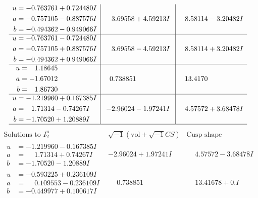 \documentclass[1p]{elsarticle_modified}
\theoremstyle{definition}
\newcommand{\I}{\sqrt{-1}}
\begin{document}
$$\begin{array}{c|c|c}
\begin{aligned}
u &= -0.763761 + 0.724480 I \\
a &= -0.757105 - 0.887576 I \\
b &= -0.494362 - 0.949066 I\end{aligned}
 & \phantom{-}3.69558 + 4.59213 I & \phantom{-}8.58114 - 3.20482 I \\ \hline\begin{aligned}
u &= -0.763761 - 0.724480 I \\
a &= -0.757105 + 0.887576 I \\
b &= -0.494362 + 0.949066 I\end{aligned}
 & \phantom{-}3.69558 - 4.59213 I & \phantom{-}8.58114 + 3.20482 I \\ \hline\begin{aligned}
u &= \phantom{-}1.18645\phantom{ +0.000000I} \\
a &= -1.67012\phantom{ +0.000000I} \\
b &= \phantom{-}1.86730\phantom{ +0.000000I}\end{aligned}
 & \phantom{-}0.738851\phantom{ +0.000000I} & \phantom{-}13.4170\phantom{ +0.000000I} \\ \hline\begin{aligned}
u &= -1.219960 + 0.167385 I \\
a &= \phantom{-}1.71314 - 0.74267 I \\
b &= -1.70520 + 1.20889 I\end{aligned}
 & -2.96024 - 1.97241 I & \phantom{-}4.57572 + 3.68478 I\\
 \hline 
 \end{array}$$\newpage$$\begin{array}{c|c|c}  
\text{Solutions to }I^u_{2}& \I (\text{vol} + \sqrt{-1}CS) & \text{Cusp shape}\\
 \hline 
\begin{aligned}
u &= -1.219960 - 0.167385 I \\
a &= \phantom{-}1.71314 + 0.74267 I \\
b &= -1.70520 - 1.20889 I\end{aligned}
 & -2.96024 + 1.97241 I & \phantom{-}4.57572 - 3.68478 I \\ \hline\begin{aligned}
u &= -0.593225 + 0.236109 I \\
a &= \phantom{-}0.109553 - 0.236109 I \\
b &= -0.449977 + 0.100617 I\end{aligned}
 & \phantom{-}0.738851\phantom{ +0.000000I} & \phantom{-}13.41678 + 0. I\phantom{ +0.000000I} \\ \hline\begin{aligned}

\end{aligned}
\end{array}$$
\end{document}
